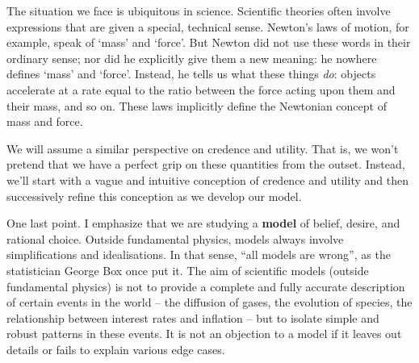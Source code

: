 
The situation we face is ubiquitous in science. Scientific theories
often involve expressions that are given a special, technical
sense. Newton's laws of motion, for example, speak of `mass' and
`force'. But Newton did not use these words in their ordinary sense;
nor did he explicitly give them a new meaning: he nowhere defines
`mass' and `force'. Instead, he tells us what these things \emph{do}:
objects accelerate at a rate equal to the ratio between the force
acting upon them and their mass, and so on. These laws implicitly
define the Newtonian concept of mass and force.

We will assume a similar perspective on credence and utility. That is,
we won't pretend that we have a perfect grip on these quantities from
the outset. Instead, we'll start with a vague and intuitive conception
of credence and utility and then successively refine this conception
as we develop our model.


One last point. I emphasize that we are studying a \textbf{model} of
belief, desire, and rational choice. Outside fundamental physics,
models always involve simplifications and idealisations. In that
sense, ``all models are wrong'', as the statistician George Box once
put it. The aim of scientific models (outside fundamental physics) is
not to provide a complete and fully accurate description of certain
events in the world -- the diffusion of gases, the evolution of
species, the relationship between interest rates and inflation -- but
to isolate simple and robust patterns in these events. It is not an
objection to a model if it leaves out details or fails to explain
various edge cases.

